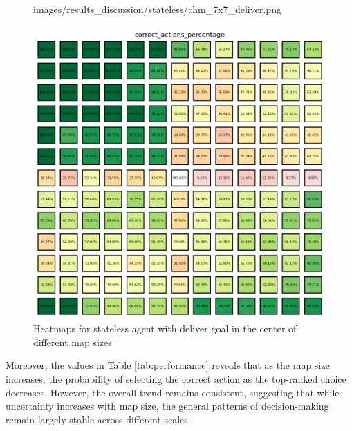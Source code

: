 \begin{figure}[!ht]
\begin{minipage}[b]{0.32\textwidth}
{      images/results_discussion/stateless/chm_7x7_deliver.png
    }
    \caption{$7 \times 7$}
    \label{fig:chm_7x7_deliver}
  \end{minipage}
  \hfill
  \begin{minipage}[b]{0.32\textwidth}
    \centering
    \includegraphics[width=\textwidth]{
      images/results_discussion/stateless/chm_13x13_deliver.png
    }
    \caption{$13 \times 13$}
    \label{fig:chm_13x13_deliver}
  \end{minipage}
  \caption{Heatmaps for stateless agent with deliver goal in the center of
  different map sizes}
  \label{fig:stateless_deliver_correctness}
\end{figure}
\vspace{5mm}

Moreover, the values in Table \ref{tab:performance} reveals that as the map size
increases, the probability of selecting the correct action as the top-ranked
choice decreases. However, the overall trend remains consistent, suggesting that
while uncertainty increases with map size, the general patterns of decision-making
remain largely stable across different scales.

